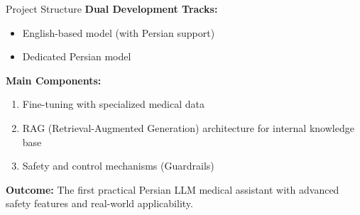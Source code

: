 \begin{frame}{Project Structure}
    \textbf{Dual Development Tracks:}
    \begin{itemize}
        \item English-based model (with Persian support)
        \item Dedicated Persian model
    \end{itemize}
    \vspace{1em}
    \textbf{Main Components:}
    \begin{enumerate}
        \item Fine-tuning with specialized medical data
        \item RAG (Retrieval-Augmented Generation) architecture for internal knowledge base
        \item Safety and control mechanisms (Guardrails)
    \end{enumerate}
    \vspace{1em}
    \textbf{Outcome:} The first practical Persian LLM medical assistant with advanced safety features and real-world applicability.
\end{frame}
